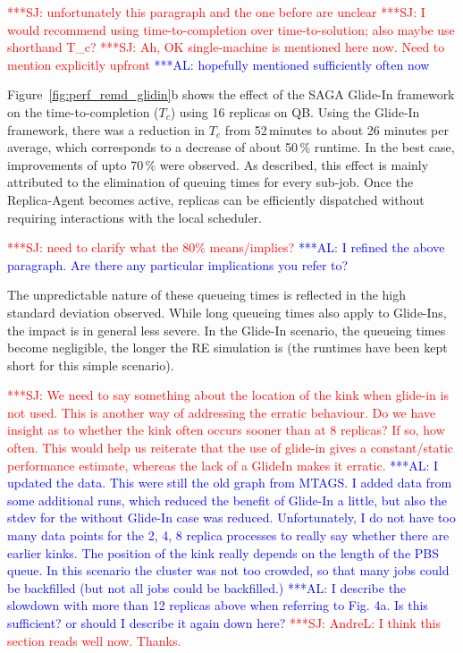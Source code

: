 \documentclass{rspublic}
\newcommand{\alnote}[1]{ {\textcolor{blue} { ***AL: #1 }}}
\newcommand{\jhanote}[1]{ {\textcolor{red} { ***SJ: #1 }}}
\newcommand{\alnote}[1]{}
\newcommand{\jhanote}[1]{}
\begin{document}
\jhanote{unfortunately this paragraph and the one before are unclear}
\jhanote{I would recommend using time-to-completion over
  time-to-solution; also maybe use shorthand T\_c?}  \jhanote{Ah, OK
  single-machine is mentioned here now. Need to mention explicitly
  upfront} \alnote{hopefully mentioned sufficiently often now}

Figure~\ref{fig:perf_remd_glidin}b shows the effect of the SAGA
Glide-In framework on the time-to-completion ($T_{c}$) using 16
replicas on QB.  Using the Glide-In framework, there was a reduction
in $T_{c}$ from 52\,minutes to about 26 minutes per average, which
corresponds to a decrease of about 50\,\% runtime.  In the best case,
improvements of upto 70\,\% were observed. As described, this effect
is mainly attributed to the elimination of queuing times for every
sub-job. Once the Replica-Agent becomes active, replicas can be
efficiently dispatched without requiring interactions with the local
scheduler.

\jhanote{need to clarify what the 80\% means/implies?} \alnote{I
  refined the above paragraph. Are there any particular implications
  you refer to?}

The unpredictable nature of these queueing times is reflected in the
high standard deviation observed. While long queueing times also apply
to Glide-Ins, the impact is in general less severe.  In the Glide-In
scenario, the queueing times become negligible, the longer the RE
simulation is (the runtimes have been kept short for this simple
scenario).

\jhanote{We need to say something about the location of the kink when
  glide-in is not used. This is another way of addressing the erratic
  behaviour. Do we have insight as to whether the kink often occurs
  sooner than at 8 replicas? If so, how often.  This would help us
  reiterate that the use of glide-in gives a constant/static
  performance estimate, whereas the lack of a GlideIn makes it
  erratic.}  \alnote{I updated the data. This were still the old graph
  from MTAGS. I added data from some additional runs, which reduced
  the benefit of Glide-In a little, but also the stdev for the without
  Glide-In case was reduced. Unfortunately, I do not have too many
  data points for the 2, 4, 8 replica processes to really say whether
  there are earlier kinks.  The position of the kink really depends on
  the length of the PBS queue. In this scenario the cluster was not
  too crowded, so that many jobs could be backfilled (but not all jobs
  could be backfilled.)}  \alnote{I describe the slowdown with more
  than 12 replicas above when referring to Fig. 4a. Is this
  sufficient? or should I describe it again down here?}
\jhanote{AndreL: I think this section reads well now. Thanks.}
\end{document}
